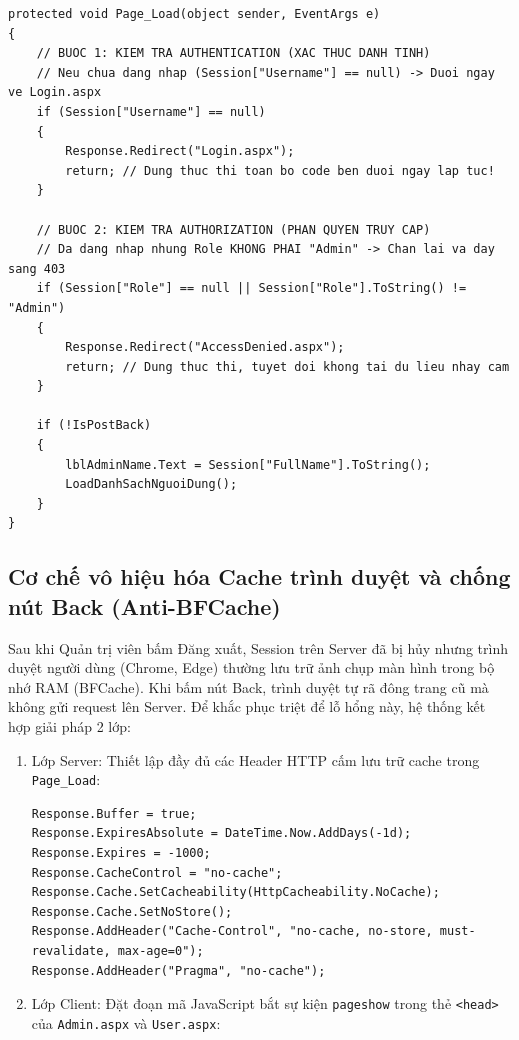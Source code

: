 \documentclass[12pt,a4paper]{report}
\begin{document}
\begin{minipage}{\linewidth}
\begin{lstlisting}[language={[Sharp]C}, caption={Cơ chế bảo vệ 2 tầng trong Page\_Load của Admin.aspx.cs}]
protected void Page_Load(object sender, EventArgs e)
{
    // BUOC 1: KIEM TRA AUTHENTICATION (XAC THUC DANH TINH)
    // Neu chua dang nhap (Session["Username"] == null) -> Duoi ngay ve Login.aspx
    if (Session["Username"] == null)
    {
        Response.Redirect("Login.aspx");
        return; // Dung thuc thi toan bo code ben duoi ngay lap tuc!
    }

    // BUOC 2: KIEM TRA AUTHORIZATION (PHAN QUYEN TRUY CAP)
    // Da dang nhap nhung Role KHONG PHAI "Admin" -> Chan lai va day sang 403
    if (Session["Role"] == null || Session["Role"].ToString() != "Admin")
    {
        Response.Redirect("AccessDenied.aspx");
        return; // Dung thuc thi, tuyet doi khong tai du lieu nhay cam
    }

    if (!IsPostBack)
    {
        lblAdminName.Text = Session["FullName"].ToString();
        LoadDanhSachNguoiDung();
    }
}
\end{lstlisting}
\end{minipage}

\newpage
\subsection{Cơ chế vô hiệu hóa Cache trình duyệt và chống nút Back (Anti-BFCache)}
Sau khi Quản trị viên bấm Đăng xuất, Session trên Server đã bị hủy nhưng trình duyệt người dùng (Chrome, Edge) thường lưu trữ ảnh chụp màn hình trong bộ nhớ RAM (BFCache). Khi bấm nút Back, trình duyệt tự rã đông trang cũ mà không gửi request lên Server. Để khắc phục triệt để lỗ hổng này, hệ thống kết hợp giải pháp 2 lớp:
\begin{enumerate}
    \item Lớp Server: Thiết lập đầy đủ các Header HTTP cấm lưu trữ cache trong \texttt{Page\_Load}:
    \begin{lstlisting}[language={[Sharp]C}]
Response.Buffer = true;
Response.ExpiresAbsolute = DateTime.Now.AddDays(-1d);
Response.Expires = -1000;
Response.CacheControl = "no-cache";
Response.Cache.SetCacheability(HttpCacheability.NoCache);
Response.Cache.SetNoStore();
Response.AddHeader("Cache-Control", "no-cache, no-store, must-revalidate, max-age=0");
Response.AddHeader("Pragma", "no-cache");
    \end{lstlisting}
    \item Lớp Client: Đặt đoạn mã JavaScript bắt sự kiện \texttt{pageshow} trong thẻ \texttt{<head>} của \texttt{Admin.aspx} và \texttt{User.aspx}:
\end{enumerate}
\end{document}

